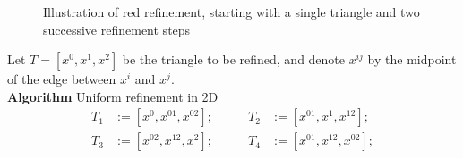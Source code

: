 \begin{figure}[h!]
    \caption{Illustration of red refinement, starting with a single triangle and two successive refinement steps}
    \label{Fig3}%
    \end{figure}

    Let $T = [x^0, x^1, x^2]$ be the triangle to be refined, and denote $x^{ij}$ by the midpoint of the edge between $x^i$ and $x^j$.\\
    \textbf{Algorithm} Uniform refinement in 2D
    \begin{align*}
    T_1 &:= [x^0, x^{01}, x^{02}]; & \qquad T_2 &:= [x^{01}, x^{1}, x^{12}];\\
    T_3 &:= [x^{02}, x^{12}, x^2]; &\qquad T_4 &:= [x^{01}, x^{12}, x^{02}];\\
    \end{align*}
    



